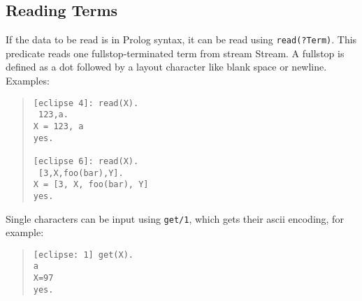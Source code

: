 \subsection{Reading {\eclipse} Terms}
If the data to be read is in Prolog syntax, it can be read using
{\tt read(?Term)}.
This predicate reads one fullstop-terminated
\eclipse term from stream Stream.
A fullstop is defined as a dot followed by a layout character like
blank space or newline.
Examples:
\begin{quote}\begin{verbatim}
[eclipse 4]: read(X).
 123,a.
X = 123, a
yes.

[eclipse 6]: read(X).
 [3,X,foo(bar),Y].
X = [3, X, foo(bar), Y]
yes.

\end{verbatim}\end{quote}

Single characters can be input using {\tt get/1}, which gets their
ascii encoding, for example:
\begin{quote}\begin{verbatim} 
[eclipse: 1] get(X).
a
X=97
yes.
\end{verbatim}\end{quote}


